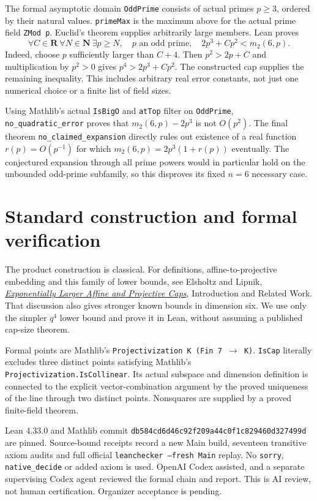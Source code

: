 \documentclass[11pt]{article}
\begin{document}
The formal asymptotic domain \texttt{OddPrime} consists of actual primes
$p\ge3$, ordered by their natural values. \texttt{primeMax} is the
maximum above for the actual prime field \texttt{ZMod p}.
Euclid's theorem supplies arbitrarily large members. Lean proves
\[
 \forall C\in\mathbf R\ \forall N\in\mathbf N\ \exists p\ge N,
 \quad p\text{ an odd prime},\quad
 2p^3+Cp^2<m_2(6,p).
\]
Indeed, choose $p$ sufficiently larger than $C+4$. Then
$p^2>2p+C$ and multiplication by $p^2>0$ gives
$p^4>2p^3+Cp^2$. The constructed cap supplies the remaining inequality.
This includes arbitrary real error constants, not just one numerical
choice or a finite list of field sizes.

Using Mathlib's actual \texttt{IsBigO} and \texttt{atTop} filter on
\texttt{OddPrime}, \texttt{no\_quadratic\_error} proves that
$m_2(6,p)-2p^3$ is not $O(p^2)$. The final theorem
\texttt{no\_claimed\_expansion} directly rules out existence of a real
function $r(p)=O(p^{-1})$ for which
$m_2(6,p)=2p^3(1+r(p))$ eventually. The conjectured expansion through
all prime powers would in particular hold on the unbounded odd-prime
subfamily, so this disproves its fixed $n=6$ necessary case.

\section{Standard construction and formal verification}
The product construction is classical. For definitions, affine-to-projective
embedding and this family of lower bounds, see Elsholtz and Lipnik,
\href{https://arxiv.org/abs/2211.09772}{\emph{Exponentially Larger Affine
and Projective Caps}}, Introduction and Related Work. That discussion
also gives stronger known bounds in dimension six. We use only the
simpler $q^4$ lower bound and prove it in Lean, without assuming a
published cap-size theorem.

Formal points are Mathlib's \texttt{Projectivization K (Fin 7 $\to$ K)}.
\texttt{IsCap} literally excludes three distinct points satisfying
Mathlib's \texttt{Projectivization.IsCollinear}. Its actual subspace
and dimension definition is connected to the explicit vector-combination
argument by the proved uniqueness of the line through two distinct
points. Nonsquares are supplied by a proved finite-field theorem.

Lean 4.33.0 and Mathlib commit
\texttt{db584cd6d46c92f209a44c0f1c829460d327499d} are pinned.
Source-bound receipts record a new Main build, seventeen transitive
axiom audits and full official \texttt{leanchecker --fresh Main} replay.
No \texttt{sorry}, \texttt{native\_decide} or added axiom is used.
OpenAI Codex assisted, and a separate supervising Codex agent reviewed
the formal chain and report. This is AI review, not human certification.
Organizer acceptance is pending.
\end{document}
